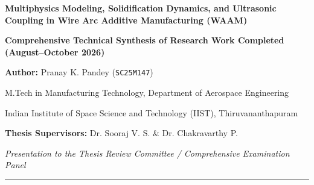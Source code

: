 \documentclass[10pt,a4paper]{article}
\begin{document}
\begin{center}
    {\LARGE\bfseries Multiphysics Modeling, Solidification Dynamics, and Ultrasonic Coupling in Wire Arc Additive Manufacturing (WAAM)\par}
    \vspace{0.6em}
    {\large\textbf{Comprehensive Technical Synthesis of Research Work Completed (August--October 2026)}\par}
    \vspace{0.6em}
    {\normalsize\textbf{Author:} Pranay K. Pandey (\texttt{SC25M147})\par}
    {\small M.Tech in Manufacturing Technology, Department of Aerospace Engineering\par}
    {\small Indian Institute of Space Science and Technology (IIST), Thiruvananthapuram\par}
    \vspace{0.3em}
    {\small\textbf{Thesis Supervisors:} Dr. Sooraj V. S. \& Dr. Chakravarthy P.\par}
    \vspace{0.2em}
    {\small\textit{Presentation to the Thesis Review Committee / Comprehensive Examination Panel}\par}
\end{center}

\vspace{0.3em}
\hrule
\vspace{0.8em}

\begin{abstract}
\noindent Over the past two months, a rigorous, multiscale computational and experimental research campaign was executed to model and optimize Wire Arc Additive Manufacturing (WAAM) and Ultrasonic-Assisted WAAM (UVA-WAAM). This technical report synthesizes all research milestones achieved across five interrelated engineering domains: (i) an open-source, conforming-mesh, thermomechanical finite-element framework implemented in FreeFEM++ with radial return \(J_2\) plasticity; (ii) high-fidelity Volume-of-Fluid (VOF) weld-pool hydrodynamics developed in OpenFOAM (\texttt{waamFoam}) incorporating Marangoni thermal-solutal convection and non-Boussinesq drag; (iii) a mesoscale dendritic phase-field suite resolving thin-interface solute trapping, microsegregation, and the Columnar-to-Equiaxed Transition (CET); (iv) ultrasonic acoustic cavitation, radiation pressure, acoustic streaming, and dislocation acoustic softening modeling; and (v) pragmatic thermal modeling and physical machine toolpath commissioning at the IIST laboratory. All underlying mathematical formulations, algorithmic corrections, verification benchmarks, and experimental setups are documented in standard scholarly prose.
\end{abstract}
\end{document}
